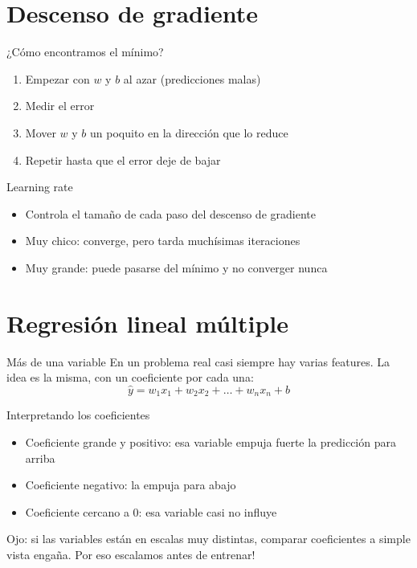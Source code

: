 \section{Descenso de gradiente}

\begin{frame}{¿Cómo encontramos el mínimo?}
  \begin{enumerate}
    \item Empezar con $w$ y $b$ al azar (predicciones malas)
    \item Medir el error
    \item Mover $w$ y $b$ un poquito en la dirección que lo reduce
    \item Repetir hasta que el error deje de bajar
  \end{enumerate}
  \pause
\end{frame}

\begin{frame}{Learning rate}
  \begin{itemize}
    \item Controla el tamaño de cada paso del descenso de gradiente
    \item Muy chico: converge, pero tarda muchísimas iteraciones
    \item Muy grande: puede pasarse del mínimo y no converger nunca
  \end{itemize}
  \pause
\end{frame}

\section{Regresión lineal múltiple}

\begin{frame}{Más de una variable}
  En un problema real casi siempre hay varias features. La idea es la
  misma, con un coeficiente por cada una:
  $$\hat{y} = w_1 x_1 + w_2 x_2 + \dots + w_n x_n + b$$
\end{frame}

\begin{frame}{Interpretando los coeficientes}
  \begin{itemize}
    \item Coeficiente grande y positivo: esa variable empuja fuerte la
      predicción para arriba
    \item Coeficiente negativo: la empuja para abajo
    \item Coeficiente cercano a 0: esa variable casi no influye
  \end{itemize}
  \pause
  Ojo: si las variables están en escalas muy distintas, comparar
  coeficientes a simple vista engaña. Por eso escalamos antes de entrenar!
\end{frame}

